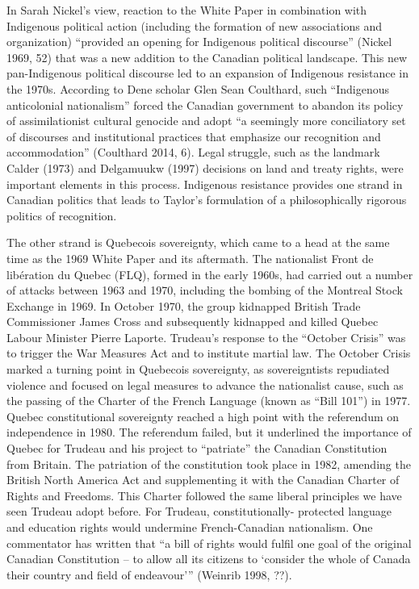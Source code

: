 \documentclass[12pt,oneside]{memoir}
\begin{document}
In Sarah Nickel's view, reaction to the White Paper in combination with Indigenous political action (including the formation of new associations and organization) ``provided an opening for Indigenous political discourse'' (Nickel 1969, 52) that was a new addition to the Canadian political landscape. This new pan-Indigenous political discourse led to an expansion of Indigenous resistance in the 1970s. According to Dene scholar Glen Sean Coulthard, such ``Indigenous anticolonial nationalism'' forced the Canadian government to abandon its policy of assimilationist cultural genocide and adopt ``a seemingly more conciliatory set of discourses and institutional practices that emphasize our recognition and accommodation'' (Coulthard 2014, 6). Legal struggle, such as the landmark Calder (1973) and Delgamuukw (1997) decisions on land and treaty rights, were important elements in this process. Indigenous resistance provides one strand in Canadian politics that leads to Taylor's formulation of a philosophically rigorous politics of recognition.

	The other strand is Quebecois sovereignty, which came to a head at the same time as the 1969 White Paper and its aftermath. The nationalist Front de libération du Quebec (FLQ), formed in the early 1960s, had carried out a number of attacks between 1963 and 1970, including the bombing of the Montreal Stock Exchange in 1969. In October 1970, the group kidnapped British Trade Commissioner James Cross and subsequently kidnapped and killed Quebec Labour Minister Pierre Laporte. Trudeau's response to the ``October Crisis'' was to trigger the War Measures Act and to institute martial law. The October Crisis marked a turning point in Quebecois sovereignty, as sovereigntists repudiated violence and focused on legal measures to advance the nationalist cause, such as the passing of the Charter of the French Language (known as ``Bill 101'') in 1977. Quebec constitutional sovereignty reached a high point with the referendum on independence in 1980. The referendum failed, but it underlined the importance of Quebec for Trudeau and his project to ``patriate'' the Canadian Constitution from Britain. The patriation of the constitution took place in 1982, amending the British North America Act and supplementing it with the Canadian Charter of Rights and Freedoms. This Charter followed the same liberal principles we have seen Trudeau adopt before. For Trudeau, constitutionally- protected language and education rights would undermine French-Canadian nationalism. One commentator has written that ``a bill of rights would fulfil one goal of the original Canadian Constitution -- to allow all its citizens to `consider the whole of Canada their country and field of endeavour''' (Weinrib 1998, ??).
\end{document}

